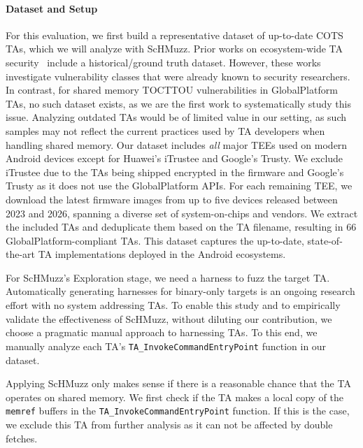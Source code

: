 \documentclass[letterpaper,twocolumn,10pt]{article}
\newcommand{\sysname}{ScHMuzz\xspace}
\newcommand{\stageone}{Exploration\xspace}
\newcommand{\numTAs}{66\xspace}
\begin{document}
\paragraph{Dataset and Setup}


%                                                                                      

For this evaluation, we first build a representative dataset of up-to-date COTS TAs, which we will analyze with \sysname. 
Prior works on ecosystem-wide TA security~\cite{rollback,globalconfusion} include a historical/ground 
truth dataset. However, these works investigate vulnerability classes that were already known to security researchers. 
In contrast, for shared memory TOCTTOU vulnerabilities in GlobalPlatform TAs, no such dataset exists, as we are the 
first work to systematically study this issue. Analyzing outdated TAs would be of 
limited value in our setting, as such samples may not reflect the current practices used by 
TA developers when handling shared memory.
Our dataset includes \emph{all} major TEEs used on modern Android devices except for Huawei's iTrustee and 
Google's Trusty. We exclude iTrustee due to the TAs being shipped encrypted in the firmware and Google's 
Trusty as it does not use the GlobalPlatform APIs. For each remaining TEE, we download the latest firmware 
images from up to five devices released between 2023 and 2026, spanning a diverse set of system-on-chips and 
vendors. We extract the included TAs and deduplicate them based on the TA filename, resulting in \numTAs 
GlobalPlatform-compliant TAs. This dataset captures the up-to-date, state-of-the-art TA implementations 
deployed in the Android ecosystems. 

For \sysname's \stageone stage, we need a harness to fuzz the target TA. 
Automatically generating harnesses for binary-only targets is an ongoing research effort with no 
system addressing TAs. To enable this study and to empirically validate the effectiveness of 
\sysname, without diluting our contribution, we choose a pragmatic manual approach to harnessing TAs.
To this end, we manually analyze each TA's \texttt{TA\_InvokeCommandEntryPoint} function in our dataset.

Applying \sysname only makes sense if there is a reasonable chance that the TA operates on shared memory.
We first check if the TA makes a local copy of the \texttt{memref} buffers in the \texttt{TA\_InvokeCommandEntryPoint} 
function. If this is the case, we 
exclude this TA from further analysis as it can not be affected by double fetches. 
\end{document}
